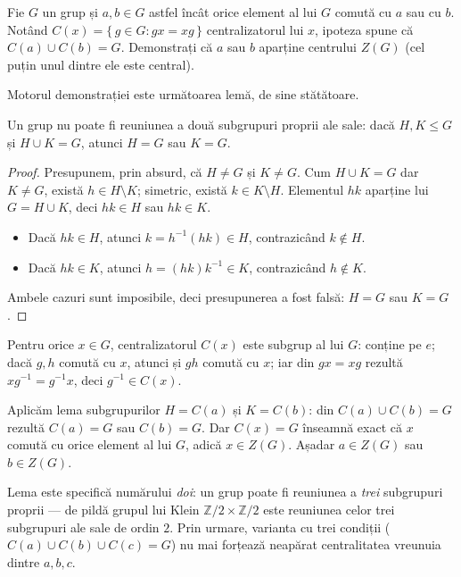 \begin{problema}
Fie $G$ un grup și $a,b \in G$ astfel încât orice element al
lui $G$ comută cu $a$ sau cu $b$. Notând $C(x)=\{\,g\in G : gx=xg\,\}$
centralizatorul lui $x$, ipoteza spune că $C(a)\cup C(b)=G$.
Demonstrați că $a$ sau $b$ aparține centrului $Z(G)$ (cel
puțin unul dintre ele este central).
\end{problema}

Motorul demonstrației este următoarea lemă, de sine
stătătoare.

\begin{lemat}
Un grup nu poate fi reuniunea a două subgrupuri proprii ale sale: dacă
$H,K \leq G$ și $H\cup K=G$, atunci $H=G$ sau $K=G$.
\end{lemat}

\begin{proof}
Presupunem, prin absurd, că $H\neq G$ și $K\neq G$. Cum $H\cup K=G$
dar $K\neq G$, există $h\in H\setminus K$; simetric, există
$k\in K\setminus H$. Elementul $hk$ aparține lui $G=H\cup K$, deci
$hk\in H$ sau $hk\in K$.
\begin{itemize}[nosep,leftmargin=1.4em]
  \item Dacă $hk\in H$, atunci $k=h^{-1}(hk)\in H$, contrazicând
        $k\notin H$.
  \item Dacă $hk\in K$, atunci $h=(hk)k^{-1}\in K$, contrazicând
        $h\notin K$.
\end{itemize}
Ambele cazuri sunt imposibile, deci presupunerea a fost falsă: $H=G$ sau
$K=G$.
\end{proof}

\begin{solutie}
Pentru orice $x\in G$, centralizatorul $C(x)$ este subgrup al lui $G$:
conține pe $e$; dacă $g,h$ comută cu $x$, atunci și $gh$
comută cu $x$; iar din $gx=xg$ rezultă $xg^{-1}=g^{-1}x$, deci
$g^{-1}\in C(x)$.

Aplicăm lema subgrupurilor $H=C(a)$ și $K=C(b)$: din
$C(a)\cup C(b)=G$ rezultă $C(a)=G$ sau $C(b)=G$. Dar $C(x)=G$ înseamnă
exact că $x$ comută cu orice element al lui $G$, adică $x\in Z(G)$.
Așadar $a\in Z(G)$ sau $b\in Z(G)$.
\end{solutie}

\begin{obs}
Lema este specifică numărului \emph{doi}: un grup poate fi reuniunea
a \emph{trei} subgrupuri proprii --- de pildă grupul lui Klein
$\mathbb{Z}/2\times\mathbb{Z}/2$ este reuniunea celor trei subgrupuri ale
sale de ordin $2$. Prin urmare, varianta cu trei condiții
($C(a)\cup C(b)\cup C(c)=G$) nu mai forțează neapărat
centralitatea vreunuia dintre $a,b,c$.
\end{obs}


